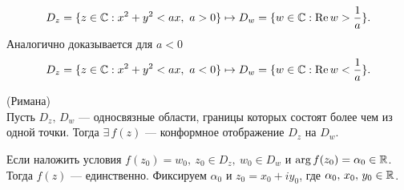 \begin{example}
\begin{center}
		\end{center}
		\[ D_z = \{z\in\mathbb{C}:x^2+y^2 < ax,\ a > 0\}\mapsto D_w = \{w\in\mathbb{C}:\operatorname{Re} w > \frac{1}{a} \}. \]
		Аналогично доказывается для $ a < 0 $
		\[ D_z = \{z\in\mathbb{C}:x^2+y^2 < ax,\ a < 0\}\mapsto D_w = \{w\in\mathbb{C}:\operatorname{Re} w < \frac{1}{a} \}. \]
	\end{example}
	\begin{theorem*}
		(Римана)\\ \indent
		Пусть $ D_z,\,D_w$ --- односвязные области, границы которых состоят более чем из одной точки.
		Тогда $\exists\,f(z)$ --- конформное отображение $D_z$ на $D_w$.  
	\end{theorem*}
	\begin{remark}
		Если наложить условия $f(z_0)=w_0,\ z_0\in D_z,\ w_0 \in D_w $ и $\arg f(z_0)=\alpha_0\in\mathbb{R}$.\\
		Тогда $f(z)$ --- единственно.
		Фиксируем $\alpha_0$ и $z_0=x_0+iy_0$, где $\alpha_0,\,x_0,\,y_0\in\mathbb{R}$.
	\end{remark}
	\newpage
